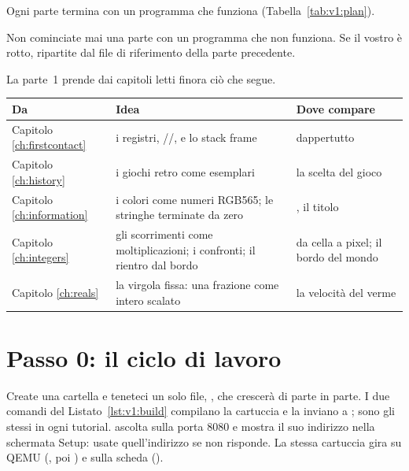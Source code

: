 Ogni parte termina con un programma che funziona (Tabella~\ref{tab:v1:plan}).

\begin{prgwarn}
Non cominciate mai una parte con un programma che non funziona. Se il vostro è
rotto, ripartite dal file di riferimento della parte precedente.
\end{prgwarn}

La parte~1 prende dai capitoli letti finora ciò che segue.

\begin{center}\small
\begin{tabularx}{\textwidth}{@{}lLL@{}}
\toprule
\textbf{Da} & \textbf{Idea} & \textbf{Dove compare}\\
\midrule
Capitolo \ref{ch:firstcontact} & i registri, //,  e lo stack frame & dappertutto\\
Capitolo \ref{ch:history} & i giochi retro come esemplari & la scelta del gioco\\
Capitolo \ref{ch:information} & i colori come numeri RGB565; le stringhe terminate da zero & , il titolo\\
Capitolo \ref{ch:integers} & gli scorrimenti come moltiplicazioni; i confronti; il rientro dal bordo & da cella a pixel; il bordo del mondo\\
Capitolo \ref{ch:reals} & la virgola fissa: una frazione come intero scalato & la velocità del verme\\
\bottomrule
\end{tabularx}
\end{center}

\section{Passo 0: il ciclo di lavoro}

Create una cartella  e teneteci un solo file,
, che crescerà di parte in parte. I due comandi del
Listato~\ref{lst:v1:build} compilano la cartuccia e la inviano a \prgqt; sono
gli stessi in ogni tutorial. \prgqt ascolta sulla porta 8080 e mostra il suo
indirizzo nella schermata Setup: usate quell'indirizzo se  non
risponde. La stessa cartuccia gira su QEMU (, poi
) e sulla scheda ().


